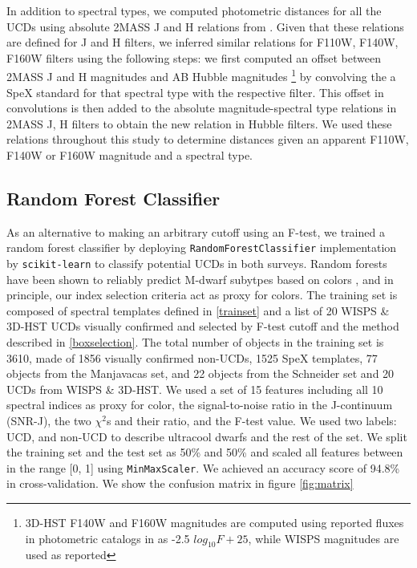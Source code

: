\documentclass[manuscript]{aastex}
\begin{document}
In addition to spectral types, we computed photometric distances for all the UCDs using absolute 2MASS J and H relations from  \cite{2012ApJS..201...19D}. Given that these relations are defined for J and H filters, we inferred similar relations for F110W, F140W, F160W filters using the following steps: we first computed an offset between 2MASS J and H magnitudes and AB Hubble magnitudes  \footnote{3D-HST F140W and F160W magnitudes are computed using reported fluxes in photometric catalogs in \citealt{Skelton2014} as -2.5  $log_{10}F+ 25$, while WISPS magnitudes are used as reported } by convolving the a SpeX standard for that spectral type with the respective filter. This offset in convolutions is then added to the absolute magnitude-spectral type relations in 2MASS J, H filters to obtain the new relation in Hubble filters. We used these relations throughout this study to determine distances given an apparent F110W, F140W or F160W magnitude and a spectral type. 

\subsection{Random Forest Classifier}

As an alternative to making an arbitrary cutoff using an F-test, we trained a random forest classifier by deploying \texttt{RandomForestClassifier} implementation by \texttt{scikit-learn} \citep{2012arXiv1201.0490P} to classify potential UCDs in both surveys. Random forests have been shown to reliably predict M-dwarf subytpes based on colors \citep{2019arXiv190505900H}, and in principle, our index selection criteria act as proxy for colors. The training set is composed of spectral templates defined in \ref{trainset} and a list of 20 WISPS \& 3D-HST UCDs visually confirmed and selected by F-test cutoff and the method described in \ref{boxselection}. The total number of objects in the training set is 3610, made of 1856 visually confirmed non-UCDs, 1525 SpeX templates, 77 objects from the Manjavacas set, and 22 objects from the Schneider set and 20 UCDs from WISPS \& 3D-HST. We used a set of 15 features including all 10 spectral indices as proxy for color, the signal-to-noise ratio in the J-continuum (SNR-J), the two $\chi^2$s and their ratio, and the F-test value. We used two labels: UCD, and non-UCD to describe ultracool dwarfs and the rest of the set. We split the training set and the test set as 50\%  and 50\% and scaled all features between in the range [0, 1] using \texttt{MinMaxScaler}. We achieved an accuracy score of 94.8\% in cross-validation. We show the confusion matrix in figure \ref{fig:matrix} %
\end{document}
